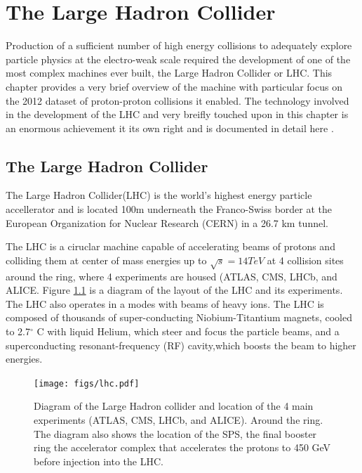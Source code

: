 \chapter[The Large Hadron Collider][The Large Hadron Collider]{The Large Hadron Collider}
\label{chapter:lhc}
Production of a sufficient number of high energy collisions to adequately explore
particle physics at the electro-weak scale required the development of one
of the most complex machines ever built, the Large Hadron Collider or LHC. This chapter
provides a very brief overview of the machine with particular focus on the 2012
dataset of proton-proton collisions it enabled. 
The technology involved in the development of the LHC and very breifly
touched upon in this chapter is an enormous achievement
it its own right and is documented in detail here \cite{1748-0221-3-08-S08001,Pettersson:291782,Linnecar:1176380}. 


\section{The Large Hadron Collider}


The Large Hadron Collider(LHC) is the world's highest energy particle accellerator 
and is located 100m underneath the Franco-Swiss border at the European Organization
for Nuclear Research (CERN) in a 26.7 km tunnel. 

The LHC is a ciruclar 
machine capable of accelerating beams of protons and colliding them at center of mass 
energies up to $\sqrt{s} = 14 TeV$ at 4 collision sites around the ring, where 4 experiments
are housed (ATLAS\cite{ATLAS_detector}, CMS\cite{748-0221-3-08-S08004}, LHCb\cite{1748-0221-3-08-S08005}, and ALICE\cite{1748-0221-3-08-S08002)}. Figure \ref{figure:lhc_lhc} is a diagram
of the layout of the LHC and its experiments\cite{Team:40525}. The LHC also operates in a modes with beams of 
heavy ions. The LHC is composed of thousands of super-conducting Niobium-Titantium 
magnets, cooled to 2.7$^\circ$ C with liquid Helium, which steer and focus the 
particle beams, and a superconducting resonant-frequency (RF) cavity,which boosts the beam
to higher energies. 

\begin{figure}[!t]
\centering 
\texttt{[image: figs/lhc.pdf]}
\caption{ Diagram of the Large Hadron collider and location of the 4 main experiments (ATLAS, CMS, LHCb, and ALICE). Around
  the ring. The diagram also shows the location of the SPS, the final booster ring the accelerator complex that accelerates
    the protons to 450 GeV before injection into the LHC. 
}
\label{figure:lhc_lhc}
\end{figure}



